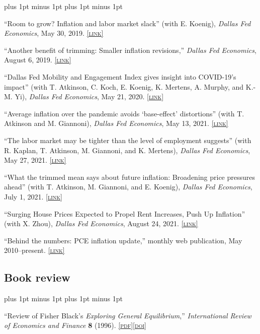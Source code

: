 \documentclass[letterpaper]{article}
\renewenvironment{itemize}{
  \begin{list}{}{
    \setlength{\leftmargin}{1.5em}
    \itemsep -1pt plus 1pt minus 1pt
    \topsep -1pt plus 1pt minus 1pt
  }
}{
  \end{list}
}
\newcommand{\pdf}[1]{\href{#1}{\scriptsize\textsc{[pdf]}}}
\newcommand{\doi}[1]{\href{http://dx.doi.org/#1}{\scriptsize\textsc{[doi]}}}
\newcommand{\link}[1]{\href{#1}{\scriptsize\textsc{[link]}}}
\begin{document}
\begin{itemize}
\item ``Room to grow? Inflation and labor market slack'' (with E. Koenig), \textit{Dallas Fed Economics}, May 30, 2019. \link{https://www.dallasfed.org/research/economics/2019/0530}

\item ``Another benefit of trimming: Smaller inflation revisions,'' \textit{Dallas Fed Economics}, August 6, 2019. \link{https://www.dallasfed.org/research/economics/2019/0806}

\item ``Dallas Fed Mobility and Engagement Index gives insight into COVID-19's impact'' (with T. Atkinson, C. Koch, E. Koenig, K. Mertens, A. Murphy, and K.-M. Yi), \textit{Dallas Fed Economics}, May 21, 2020. \link{https://www.dallasfed.org/research/economics/2020/0521}

\item ``Average inflation over the pandemic avoids `base-effect' distortions'' (with T. Atkinson and M. Giannoni), \textit{Dallas Fed Economics}, May 13, 2021. \link{https://www.dallasfed.org/research/economics/2021/0513}

\item ``The labor market may be tighter than the level of employment suggests'' (with R. Kaplan, T. Atkinson, M. Giannoni, and K. Mertens), \textit{Dallas Fed Economics}, May 27, 2021. \link{https://www.dallasfed.org/research/economics/2021/0527}

\item ``What the trimmed mean says about future inflation: Broadening price pressures ahead'' (with T. Atkinson, M. Giannoni, and E. Koenig), \textit{Dallas Fed Economics}, July 1, 2021. \link{https://www.dallasfed.org/research/economics/2021/0701}

\item ``Surging House Prices Expected to Propel Rent Increases, Push Up Inflation'' (with X. Zhou), \textit{Dallas Fed Economics}, August 24, 2021. \link{https://www.dallasfed.org/research/economics/2021/0824}

\item ``Behind the numbers: PCE inflation update,'' monthly web publication, May 2010--present.  \link{http://dallasfed.org/research/pce/inflation.cfm} 
\end{itemize}

\subsection*{Book review}
\begin{itemize}
\item ``Review of Fisher Black's \textit{Exploring General Equilibrium},'' \textit{International Review of Economics and Finance} \textbf{8} (1996). \pdf{https://jimdolmas.github.io/assets/fisher_black.pdf}\doi{10.1016/S1059-0560(96)90038-6}
\end{itemize}
\end{document}
